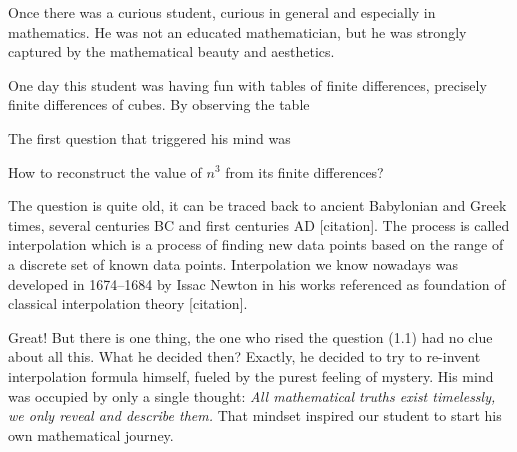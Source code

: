 Once there was a curious student, curious in general and especially in mathematics.
He was not an educated mathematician, but he was strongly captured by the mathematical
beauty and aesthetics.

One day this student was having fun with tables of finite differences, precisely finite differences of cubes.
By observing the table

The first question that triggered his mind was
\begin{question}
    How to reconstruct the value of $n^3$ from its finite differences?
\end{question}
The question is quite old, it can be traced back to ancient Babylonian and Greek times,
several centuries BC and first centuries AD [citation].
The process is called interpolation which is a process
of finding new data points based on the range of a discrete set
of known data points.
Interpolation we know nowadays was developed in 1674--1684 by Issac Newton
in his works referenced as foundation of classical interpolation theory [citation].

Great!
But there is one thing, the one who rised the question (1.1) had no clue about all this.
What he decided then?
Exactly, he decided to try to re-invent interpolation formula himself,
fueled by the purest feeling of mystery.
His mind was occupied by only a single thought:
\textit{
    All mathematical truths exist timelessly, we only reveal and describe them.
}
That mindset inspired our student to start his own mathematical journey.

